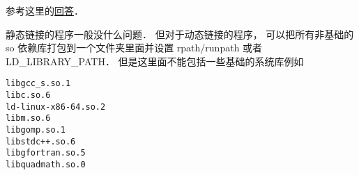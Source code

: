 
\begin{issues}
\issueDraft
\end{issues}


参考这里的\href{https://stackoverflow.com/questions/20183883/determining-binary-compatibility-under-linux}{回答}．

静态链接的程序一般没什么问题． 但对于动态链接的程序， 可以把所有非基础的 so 依赖库打包到一个文件夹里面并设置 rpath/runpath 或者 LD_LIBRARY_PATH． 但是这里面不能包括一些基础的系统库例如
\begin{lstlisting}[language=none]
libgcc_s.so.1
libc.so.6
ld-linux-x86-64.so.2
libm.so.6
libgomp.so.1
libstdc++.so.6
libgfortran.so.5
libquadmath.so.0
\end{lstlisting}
